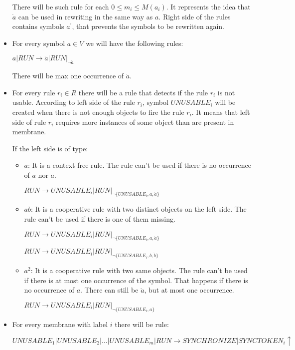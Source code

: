 \begin{dokaz}
\begin{itemize}
    There will be such rule for each $0\leq m_i\leq M(a_i)$. It represents the idea that $\dot{a}$ can be used in rewriting in the same way as $a$. Right side of the rules contains symbols $a^\prime$, that prevents the symbols to be rewritten again.

    \item For every symbol $a\in V$ we will have the following rules:

    $a|RUN \rightarrow \dot{a}|RUN|_{\neg \dot{a}}$

    There will be max one occurrence of $\dot{a}$.

    \item For every rule $r_i\in R$ there will be a rule that detects if the rule $r_i$ is not usable. According to left side of the rule $r_i$, symbol $UNUSABLE_i$ will be created when there is not enough objects to fire the rule $r_i$. It means that left side of rule $r_i$ requires more instances of some object than are present in membrane.

    If the left side is of type:
    \begin{itemize}
      \item $a$: It is a context free rule. The rule can't be used if there is no occurrence of $a$ nor $\dot{a}$.

      $RUN \rightarrow UNUSABLE_i|RUN|_{\neg\{UNUSABLE_i, a, \dot{a}\}}$

      \item $ab$: It is a cooperative rule with two distinct objects on the left side. The rule can't be used if there is one of them missing.

      $RUN \rightarrow UNUSABLE_i|RUN|_{\neg\{UNUSABLE_i, a, \dot{a}\}}$

      $RUN \rightarrow UNUSABLE_i|RUN|_{\neg\{UNUSABLE_i, b, \dot{b}\}}$

      \item $a^2$: It is a cooperative rule with two same objects. The rule can't be used if there is at most one occurrence of the symbol. That happens if there is no occurrence of $a$. There can still be $\dot{a}$, but at most one occurrence.

      $RUN \rightarrow UNUSABLE_i|RUN|_{\neg\{UNUSABLE_i, a\}}$
    \end{itemize}

    

    \item For every membrane with label $i$ there will be rule:

    $UNUSABLE_1|UNUSABLE_2|\dots|UNUSABLE_m|RUN \rightarrow SYNCHRONIZE|SYNCTOKEN_i\uparrow$


\end{itemize}
\end{dokaz}
